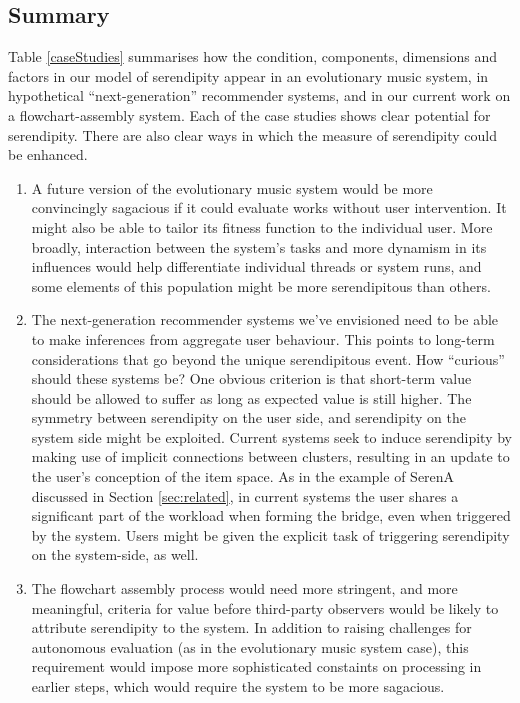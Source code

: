 \subsection{Summary}

Table \ref{caseStudies} summarises how the condition, components,
dimensions and factors in our model of serendipity appear in an
evolutionary music system, in hypothetical ``next-generation''
recommender systems, and in our current work on a flowchart-assembly
system.  Each of the case studies shows clear potential for
serendipity.  There are also clear ways in which the measure of
serendipity could be enhanced.

\begin{enumerate}
\item A future version of the evolutionary music system would be more
  convincingly sagacious if it could evaluate works without user
  intervention.  It might also be able to tailor its fitness function
  to the individual user.  More broadly, interaction between the
  system's tasks and more dynamism in its influences would help
  differentiate individual threads or system runs, and some elements
  of this population might be more serendipitous than others.

\item The next-generation recommender systems we've envisioned need to
  be able to make inferences from aggregate user behaviour.  This
  points to long-term considerations that go beyond the unique
  serendipitous event.  How ``curious'' should these systems be?  One
  obvious criterion is that short-term value should be allowed to
  suffer as long as expected value is still higher.  The symmetry
  between serendipity on the user side, and serendipity on the system
  side might be exploited.  Current systems seek to induce serendipity
  by making use of implicit connections between clusters, resulting in
  an update to the user's conception of the item space.  As in the
  example of {\sf SerenA} discussed in Section \ref{sec:related}, in
  current systems the user shares a significant part of the workload
  when forming the bridge, even when triggered by the system.  Users
  might be given the explicit task of triggering serendipity on the
  system-side, as well.

\item The flowchart assembly process would need more stringent, and
  more meaningful, criteria for value before third-party observers
  would be likely to attribute serendipity to the system.  In addition
  to raising challenges for autonomous evaluation (as in the
  evolutionary music system case), this requirement would impose more
  sophisticated constaints on processing in earlier steps, which would
  require the system to be more sagacious.
\end{enumerate}

